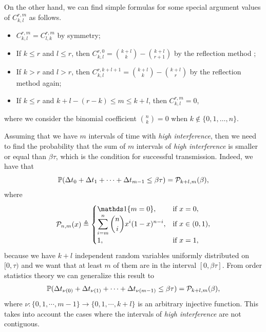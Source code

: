 \begin{remark} \label{rem:Ch5_Crmkl}
    On the other hand, we can find simple formulas for some special argument values of $C_{k,l}^{r,m}$ as follows.
    \begin{itemize}
        \item $C_{k,l}^{r,m} = C_{l,k}^{r,m}$ by symmetry;
        
        \item If $k\leq r$ and $l\leq r$, then $C_{k,l}^{r,0} = \binom{k+l}{k} - \binom{k+l}{r+1}$ by the reflection method \cite{feller1968introduction};
        
        \item If $k>r$ and $l>r$, then $C_{k,l}^{r,k+l+1} = \binom{k+l}{k} - \binom{k+l}{r}$ by the reflection method again;
        
        \item If $k\leq r$ and $k+l-(r-k) \leq m \leq k+l$, then $C_{k,l}^{r,m}=0$,
    \end{itemize}
    where we consider the binomial coefficient $\binom{n}{k} = 0$ when $k \notin \{0,1,\dots,n\}$.
\end{remark}

Assuming that we have $m$ intervals of time with \textit{high interference}, then we need to find the probability that the sum of $m$ intervals of \textit{high interference} is smaller or equal than $\beta\tau$, which is the condition for successful transmission.
%
Indeed, we have that
\[
    \P(\Delta t_0 + \Delta t_1 + \cdots + \Delta t_{m-1} \leq \beta\tau) = \cal{P}_{k+l,m}(\beta),
\]
where
\begin{align} \label{eq:Ch5_Pdef}
    \cal{P}_{n,m}(x) \triangleq
    \begin{cases}
        \ind\{m = 0\}, &\text{if } x = 0,\\
        \displaystyle\sum_{i=m}^{n} \binom{n}{i}x^i(1-x)^{n-i}, &\text{if } x\in(0,1),\\
        1, &\text{if } x = 1,
    \end{cases}
\end{align}
because we have $k+l$ independent random variables uniformly distributed on $[0,\tau)$ and we want that at least $m$ of them are in the interval $[0,\beta\tau]$.
%
From order statistics theory we can generalize this result to
\begin{align} \label{eq:ch5_Pdeltat}
	\P(\Delta t_{\nu(0)} + \Delta t_{\nu(1)} + \cdots + \Delta t_{\nu(m-1)} \leq \beta\tau) = \cal{P}_{k+l,m}(\beta),
\end{align}
where $\nu:\{0,1,\cdots,m-1\} \longrightarrow \{0,1,\cdots,k+l\}$ is an arbitrary injective function.
%
This takes into account the cases where the intervals of \textit{high interference} are not contiguous.

